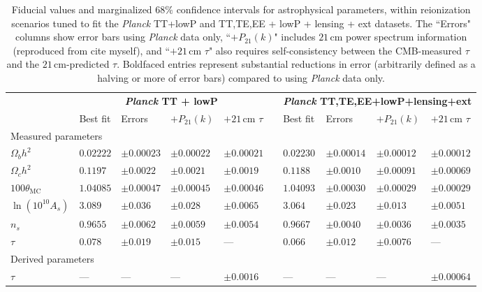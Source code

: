 \documentclass[twocolumn,aps,prd,nofootinbib,showpacs]{revtex4-1}
\begin{document}
\begin{table}
\caption{\label{tab:CosmoParams} Fiducial values and marginalized $68\%$ confidence intervals for astrophysical parameters, within reionization scenarios tuned to fit the \emph{Planck} TT+lowP and TT,TE,EE + lowP + lensing + ext datasets. The ``Errors" columns show error bars using \emph{Planck} data only, ``$+P_{21} (k)$" includes $21\,\textrm{cm}$ power spectrum information (reproduced from \acl{cite myself}), and ``$+21\,\textrm{cm}$ $\tau$" also requires self-consistency between the CMB-measured $\tau$ and the $21\,\textrm{cm}$-predicted $\tau$. Boldfaced entries represent substantial reductions in error (arbitrarily defined as a halving or more of error bars) compared to using \emph{Planck} data only.}
\begin{ruledtabular}
\begin{tabular}{lllllcllll}
 & \multicolumn{4}{c}{\textbf{\emph{Planck} TT + lowP}} && \multicolumn{4}{l}{\textbf{ \emph{Planck} TT,TE,EE+lowP+lensing+ext}  } \\
 & Best fit & Errors &  $+P_{21} (k)$ &$+21\,\textrm{cm}$ $\tau$&& Best fit & Errors &  $+P_{21} (k)$ &  $+21\,\textrm{cm}$ $\tau$\\
\hline
\multicolumn{7}{l}{Measured parameters} \\
$\Omega_b h^2$ \dotfill & $0.02222 $&$ \pm 0.00023$ & $\pm 0.00022$ &  $\pm 0.00021$ && $0.02230 $&$\pm 0.00014$ & $\pm 0.00012$ &  $\pm 0.00012$ \\
$\Omega_c h^2$ \dotfill & $0.1197$&$ \pm 0.0022$  & $\pm 0.0021$ &  $\pm 0.0019$ && $0.1188$&$ \pm 0.0010$ & $\pm 0.00091$ &  $\pm 0.00069$ \\
$100 \theta_\textrm{MC}$\dotfill  & $1.04085 $&$\pm 0.00047$ & $\pm 0.00045$ &  $\pm 0.00046$ & &$1.04093 $&$\pm 0.00030$ & $\pm 0.00029$ & $\pm 0.00029$ \\
$\ln ( 10^{10} A_s) $ \dotfill & $3.089 $&$\pm 0.036$ & $\pm 0.028$ &  $\mathbf{\pm 0.0065}$ & &$3.064$&$ \pm 0.023$ & $\pm 0.013$ & $\mathbf{\pm 0.0051}$  \\
$ n_s $\dotfill  & $ 0.9655$&$ \pm 0.0062$ & $\pm 0.0059$ &  $\pm 0.0054$ && $0.9667$&$ \pm 0.0040$ & $\pm 0.0036$ &  $\pm 0.0035$ \\
$ \tau $ \dotfill & $0.078 $&$\pm 0.019$ & $\pm 0.015$ &  ---  && $0.066 $&$\pm 0.012$ & $\pm 0.0076$ &  --- \\
\hline
\multicolumn{7}{l}{Derived parameters} \\
$ \tau $\dotfill  & --- & ---  & --- & $ \mathbf{\pm 0.0016}$ &&---  & ---  & ---& $ \mathbf{\pm 0.00064}$ \\

\end{tabular}
\end{ruledtabular}
\end{table}
\end{document}
